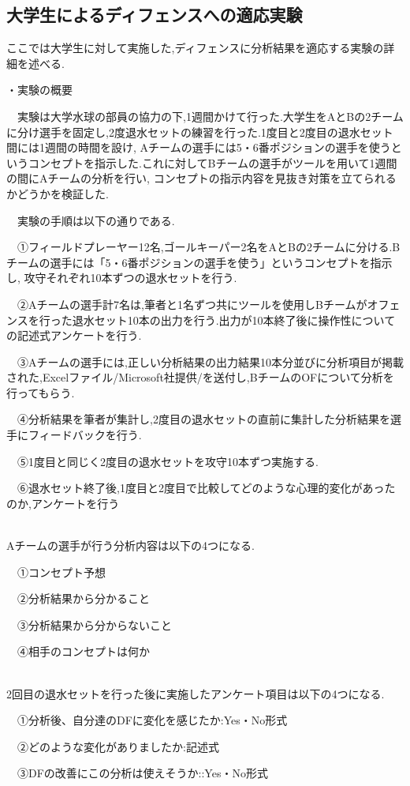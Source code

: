 \documentclass[../main.tex]{subfiles}
\begin{document}
\subsection{大学生によるディフェンスへの適応実験}
ここでは大学生に対して実施した,ディフェンスに分析結果を適応する実験の詳細を述べる.\par
・実験の概要
\par　実験は大学水球の部員の協力の下,1週間かけて行った.大学生をAとBの2チームに分け選手を固定し,2度退水セットの練習を行った.1度目と2度目の退水セット間には1週間の時間を設け,
Aチームの選手には5・6番ポジションの選手を使うというコンセプトを指示した.これに対してBチームの選手がツールを用いて1週間の間にAチームの分析を行い,
コンセプトの指示内容を見抜き対策を立てられるかどうかを検証した.
\par　実験の手順は以下の通りである.
\par　①フィールドプレーヤー12名,ゴールキーパー2名をAとBの2チームに分ける.Bチームの選手には「5・6番ポジションの選手を使う」というコンセプトを指示し,
攻守それぞれ10本ずつの退水セットを行う.
\par　②Aチームの選手計7名は,筆者と1名ずつ共にツールを使用しBチームがオフェンスを行った退水セット10本の出力を行う.出力が10本終了後に操作性についての記述式アンケートを行う.
\par　③Aチームの選手には,正しい分析結果の出力結果10本分並びに分析項目が掲載された,Excelファイル{/Microsoft社提供/}を送付し,BチームのOFについて分析を行ってもらう.
\par　④分析結果を筆者が集計し,2度目の退水セットの直前に集計した分析結果を選手にフィードバックを行う.
\par　⑤1度目と同じく2度目の退水セットを攻守10本ずつ実施する.
\par　⑥退水セット終了後,1度目と2度目で比較してどのような心理的変化があったのか,アンケートを行う



\leavevmode\\
Aチームの選手が行う分析内容は以下の4つになる.
\par　①コンセプト予想
\par　②分析結果から分かること
\par　③分析結果から分からないこと
\par　④相手のコンセプトは何か


\leavevmode\\
2回目の退水セットを行った後に実施したアンケート項目は以下の4つになる.
\par　①分析後、自分達のDFに変化を感じたか:Yes・No形式
\par　②どのような変化がありましたか:記述式
\par　③DFの改善にこの分析は使えそうか::Yes・No形式
\end{document}
